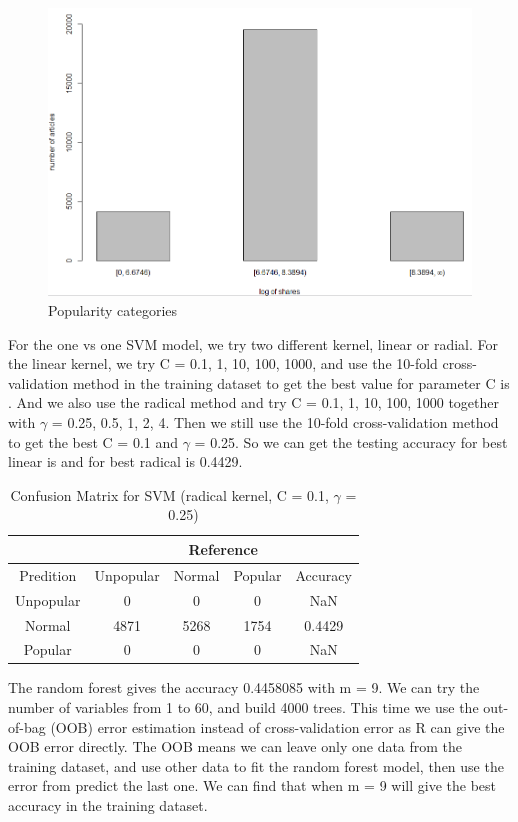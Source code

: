 \documentclass[11pt]{article}
\begin{document}
    \begin{figure}[h]
        \centering
        \includegraphics[width=0.7\linewidth]{poplularity.png}
        \caption{Popularity categories}
    \end{figure}

For the one vs one SVM model, we try two different kernel, linear or radial. For the linear kernel, we try C = 0.1, 1, 10, 100, 1000, and use the 10-fold cross-validation method in the training dataset to get the best value for parameter C is . And we also use the radical method and try C = 0.1, 1, 10, 100, 1000 together with $\gamma$ = 0.25, 0.5, 1, 2, 4. Then we still use the 10-fold cross-validation method to get the best C = 0.1 and $\gamma$ = 0.25. So we can get the testing accuracy for best linear is and for best radical is 0.4429.

    \begin{table}[h]
        \centering
        \caption{Confusion Matrix for SVM (radical kernel, C = 0.1, $\gamma$ = 0.25)}
        \begin{tabular}{ c | c | c | c | c }
            \hline\hline
            {} & \multicolumn{4}{c}{Reference} \\
            \hline
            Predition & Unpopular & Normal & Popular & Accuracy\\
            \hline
            Unpopular & 0 & 0 & 0 & NaN\\
            \hline
            Normal & 4871 & 5268 & 1754 & 0.4429\\
            \hline
            Popular & 0 & 0 & 0 & NaN\\
            \hline\hline
        \end{tabular}
        \label{table:knn}
    \end{table}

The random forest gives the accuracy 0.4458085 with m = 9. We can try the number of variables from 1 to 60, and build 4000 trees. This time we use the out-of-bag (OOB) error estimation instead of cross-validation error as R can give the OOB error directly. The OOB means we can leave only one data from the training dataset, and use other data to fit the random forest model, then use the error from predict the last one. We can find that when m = 9 will give the best accuracy in the training dataset. 
\end{document}
